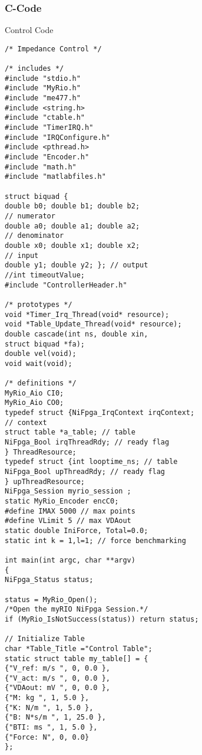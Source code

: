 \subsubsection*{C-Code}
\item{Control Code}
\begin{verbatim}
/* Impedance Control */

/* includes */
#include "stdio.h"
#include "MyRio.h"
#include "me477.h"
#include <string.h>
#include "ctable.h"
#include "TimerIRQ.h"
#include "IRQConfigure.h"
#include <pthread.h>
#include "Encoder.h"
#include "math.h"
#include "matlabfiles.h"

struct biquad {
double b0; double b1; double b2; 
// numerator
double a0; double a1; double a2; 
// denominator
double x0; double x1; double x2; 
// input
double y1; double y2; }; // output
//int timeoutValue;
#include "ControllerHeader.h"

/* prototypes */
void *Timer_Irq_Thread(void* resource);
void *Table_Update_Thread(void* resource);
double cascade(int ns, double xin, 
struct biquad *fa);
double vel(void);
void wait(void);

/* definitions */
MyRio_Aio CI0;
MyRio_Aio CO0;
typedef struct {NiFpga_IrqContext irqContext; 
// context
struct table *a_table; // table
NiFpga_Bool irqThreadRdy; // ready flag
} ThreadResource;
typedef struct {int looptime_ns; // table
NiFpga_Bool upThreadRdy; // ready flag
} upThreadResource;
NiFpga_Session myrio_session ;
static MyRio_Encoder encC0;
#define IMAX 5000 // max points
#define VLimit 5 // max VDAout
static double IniForce, Total=0.0;
static int k = 1,l=1; // force benchmarking

int main(int argc, char **argv)
{
NiFpga_Status status;

status = MyRio_Open();  	
/*Open the myRIO NiFpga Session.*/
if (MyRio_IsNotSuccess(status)) return status;

// Initialize Table
char *Table_Title ="Control Table";
static struct table my_table[] = {
{"V_ref: m/s ", 0, 0.0 },
{"V_act: m/s ", 0, 0.0 },
{"VDAout: mV ", 0, 0.0 },
{"M: kg ", 1, 5.0 },
{"K: N/m ", 1, 5.0 },
{"B: N*s/m ", 1, 25.0 },
{"BTI: ms ", 1, 5.0 },
{"Force: N", 0, 0.0}
};


\end{verbatim}
